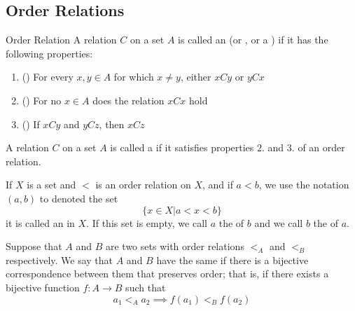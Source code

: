\documentclass[12pt, a4paper, oneside, openright, titlepage]{book}
\begin{document}
\begin{appendices}
    \subsection{Order Relations}

    \begin{defn}{Order Relation}
        A relation $C$ on a set $A$ is called an  (or , or a ) if it has the following properties: \begin{enumerate}
            \item () For every $x,y \in A$ for which $x \neq y$, either $xCy$ or $yCx$
            \item () For no $x \in A$ does the relation $xCx$ hold
            \item () If $xCy$ and $yCz$, then $xCz$
        \end{enumerate}
    \end{defn}

    \begin{defn}
        A relation $C$ on a set $A$ is called a  if it satisfies properties $2.$ and $3.$ of an order relation.
    \end{defn}

    
    \begin{defn}
        If $X$ is a set and $<$ is an order relation on $X$, and if $a < b$, we use the notation $(a,b)$ to denoted the set \begin{equation*}
            \{x \in X\vert a < x < b\}
        \end{equation*}
        it is called an  in $X$. If this set is empty, we call $a$ the  of $b$ and we call $b$ the  of $a$.
    \end{defn}

    \begin{defn}
        Suppose that $A$ and $B$ are two sets with order relations $<_A$ and $<_B$ respectively. We say that $A$ and $B$ have the same  if there is a bijective correspondence between them that preserves order; that is, if there exists a bijective function $f:A\rightarrow B$ such that \begin{equation*}
            a_1 <_A a_2 \implies f(a_1) <_B f(a_2)
        \end{equation*}
    \end{defn}


\end{appendices}
\end{document}
